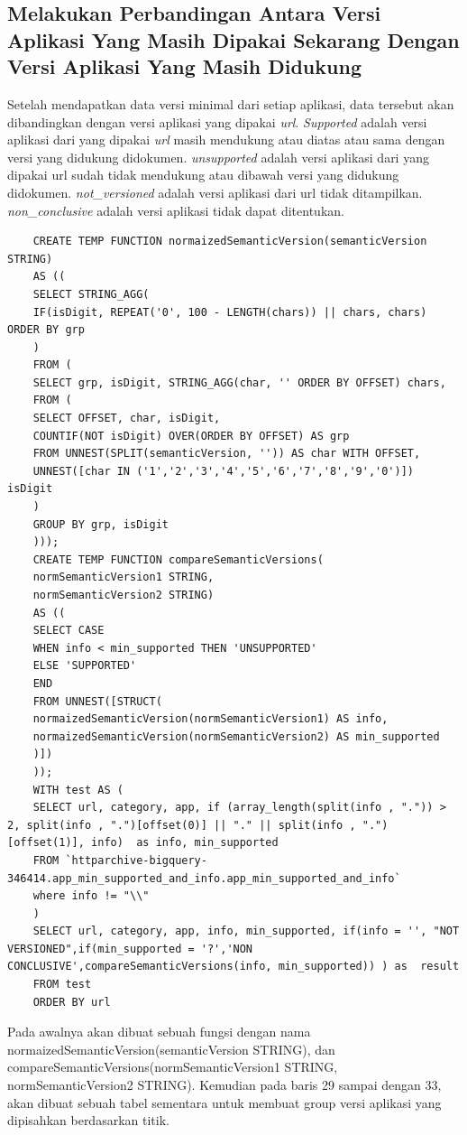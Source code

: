 \subsection{Melakukan Perbandingan Antara Versi Aplikasi Yang Masih Dipakai Sekarang Dengan Versi Aplikasi Yang Masih Didukung} \label{version_compare}
Setelah mendapatkan data versi minimal dari setiap aplikasi, data tersebut akan dibandingkan dengan versi aplikasi yang dipakai \textit{url}. \textit{Supported} adalah versi aplikasi dari yang dipakai \textit{url} masih mendukung atau diatas atau sama dengan versi yang didukung didokumen. \textit{unsupported} adalah versi aplikasi dari yang dipakai url sudah tidak mendukung atau dibawah versi yang didukung didokumen. \textit{not\_versioned} adalah versi aplikasi dari url tidak ditampilkan. \textit{non\_conclusive} adalah versi aplikasi tidak dapat ditentukan. 
\begin{lstlisting}
	CREATE TEMP FUNCTION normaizedSemanticVersion(semanticVersion STRING) 
	AS ((
	SELECT STRING_AGG(
	IF(isDigit, REPEAT('0', 100 - LENGTH(chars)) || chars, chars) ORDER BY grp 
	)
	FROM (
	SELECT grp, isDigit, STRING_AGG(char, '' ORDER BY OFFSET) chars,
	FROM (
	SELECT OFFSET, char, isDigit,
	COUNTIF(NOT isDigit) OVER(ORDER BY OFFSET) AS grp
	FROM UNNEST(SPLIT(semanticVersion, '')) AS char WITH OFFSET, 
	UNNEST([char IN ('1','2','3','4','5','6','7','8','9','0')]) isDigit
	)
	GROUP BY grp, isDigit
	)));
	CREATE TEMP FUNCTION compareSemanticVersions(
	normSemanticVersion1 STRING, 
	normSemanticVersion2 STRING) 
	AS ((
	SELECT CASE 
	WHEN info < min_supported THEN 'UNSUPPORTED'
	ELSE 'SUPPORTED'
	END
	FROM UNNEST([STRUCT(
	normaizedSemanticVersion(normSemanticVersion1) AS info, 
	normaizedSemanticVersion(normSemanticVersion2) AS min_supported
	)])
	));
	WITH test AS (
	SELECT url, category, app, if (array_length(split(info , ".")) > 2, split(info , ".")[offset(0)] || "." || split(info , ".")[offset(1)], info)  as info, min_supported	
	FROM `httparchive-bigquery-346414.app_min_supported_and_info.app_min_supported_and_info`
	where info != "\\"
	)
	SELECT url, category, app, info, min_supported, if(info = '', "NOT VERSIONED",if(min_supported = '?','NON CONCLUSIVE',compareSemanticVersions(info, min_supported)) ) as  result
	FROM test 
	ORDER BY url
\end{lstlisting}
Pada awalnya akan dibuat sebuah fungsi dengan nama normaizedSemanticVersion(semanticVersion STRING), dan compareSemanticVersions(normSemanticVersion1 STRING, normSemanticVersion2 STRING). Kemudian pada baris 29 sampai dengan 33, akan dibuat sebuah tabel sementara untuk membuat group versi aplikasi yang dipisahkan berdasarkan titik.


